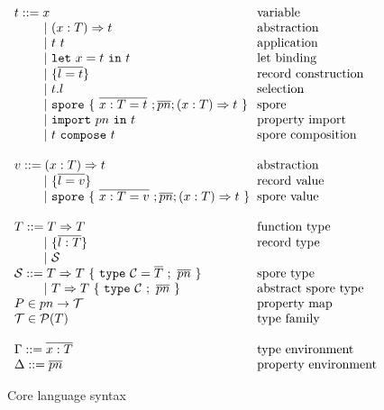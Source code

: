 \documentclass{llncs}
\newcommand{\seq}[1]{\overline{#1}}
\newcommand{\ba}{\begin{array}}
\newcommand{\ea}{\end{array}}
\newcommand{\gap}{\quad\quad}
\begin{document}
\begin{figure}[ht!]
  \centering

  $\ba[t]{l@{\hspace{2mm}}l}
t ::=     x                                 & \mbox{variable}
\\
\gap ~|~  (x: T) \Rightarrow t              & \mbox{abstraction}
\\
\gap ~|~  t~t                               & \mbox{application}
\\
\gap ~|~  \texttt{let}~x = t~\texttt{in}~t  & \mbox{let binding}
\\
\gap ~|~  \{ \seq{l = t} \}                 & \mbox{record construction}
\\
\gap ~|~  t.l                               & \mbox{selection}
\\
\gap ~|~  \texttt{spore}~\{~\seq{x : T = t}~; \seq{pn} ; (x: T) \Rightarrow t~\}  & \mbox{spore}
\\
\gap ~|~  \texttt{import}~pn~\texttt{in}~t  & \mbox{property import}
\\
\gap ~|~  t~\texttt{compose}~t              & \mbox{spore composition}
\\
 & \\
v ::=     (x: T) \Rightarrow t              & \mbox{abstraction}
\\
\gap ~|~  \{ \seq{l = v} \}                 & \mbox{record value}
\\
\gap ~|~  \texttt{spore}~\{~\seq{x : T = v}~; \seq{pn} ; (x: T) \Rightarrow t~\}  & \mbox{spore value}
\\
 & \\
T ::=     T \Rightarrow T                   & \mbox{function type} \\
\gap ~|~  \{ \seq{l : T} \}                 & \mbox{record type}   \\
\gap ~|~  \mathcal{S}                       & \mbox{}
\\
\mathcal{S} ::= T \Rightarrow T~\{~\texttt{type}~\mathcal{C} = \seq{T}~;~\seq{pn}~\}   & \mbox{spore type}
\\
\gap ~|~  T \Rightarrow T~\{~\texttt{type}~\mathcal{C}~;~\seq{pn}~\}   & \mbox{abstract spore type}
\\
P \in pn \rightarrow \mathcal{T} & \mbox {property map}
\\
\mathcal{T} \in \mathcal{P}(T)   & \mbox{type family}
\\
 & \\
\Gamma ::=  \seq{x : T}          & \mbox{type environment}
\\
\Delta ::=  \seq{pn}             & \mbox{property environment}
\\
\ea$

  \caption{Core language syntax}
  \label{fig:syntax}
  \vspace{-5mm}
\end{figure}
\end{document}

